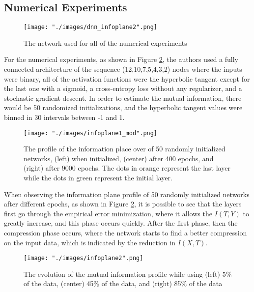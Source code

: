 \subsection{Numerical Experiments}
\begin{figure}[ht]
\begin{center}
    \texttt{[image: "./images/dnn\_infoplane2".png]}
    \caption{The network used for all of the numerical experiments}
    \label{fig::dnn_infoplane}
\end{center}
\end{figure}

For the numerical experiments, as shown in Figure \ref{fig::dnn_infoplane}, the authors used a fully connected architecture of the sequence (12,10,7,5,4,3,2) nodes where the inputs were binary, all of the activation functions were the hyperbolic tangent except for the last one with a sigmoid, a cross-entropy loss without any regularizer, and a stochastic gradient descent. In order to estimate the mutual information, there would be 50 randomized initializations, and the hyperbolic tangent values were binned in 30 intervals between -1 and 1.

\begin{figure}[ht]
\begin{center}
    \texttt{[image: "./images/infoplane1\_mod".png]}
    \caption{The profile of the information place over of 50 randomly initialized networks, (left) when initialized, (center) after 400 epochs, and (right) after 9000 epochs. The dots in orange represent the last layer while the dots in green represent the initial layer.}
    \label{fig::dnn_infoplane}
\end{center}
\end{figure}

When observing the information plane profile of 50 randomly initialized networks after different epochs, as shown in Figure \ref{fig::dnn_infoplane}, it is possible to see that the layers first go through the empirical error minimization, where it allows the $I(T,Y)$ to greatly increase, and this phase occurs quickly. After the first phase, then the compression phase occurs, where the network starts to find a better compression on the input data, which is indicated by the reduction in $I(X,T)$.

\begin{figure}[ht]
\begin{center}
    \texttt{[image: "./images/infoplane2".png]}
    \caption{The evolution of the mutual information profile while using (left) 5\% of the data, (center) 45\% of the data, and (right) 85\% of the data}
    \label{fig::info_trainingdata1}
\end{center}
\end{figure}

